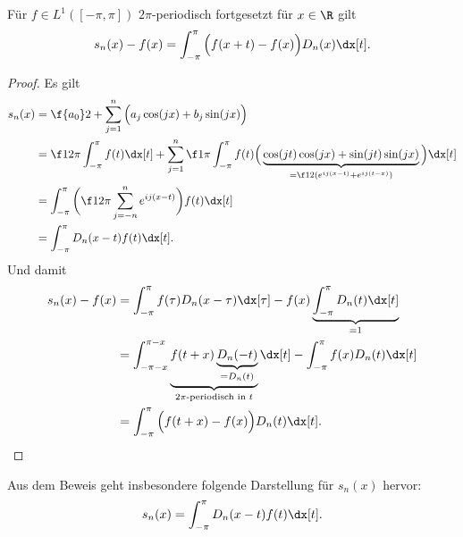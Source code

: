 \begin{lem} \label{3.26}
	Für $f \in L^1([-\pi, \pi])$ $2\pi$-periodisch fortgesetzt für $x\in \R$ gilt
	\begin{align*}
		s_n(x) - f(x) = \int_{-\pi}^{\pi} \Big(f(x+t) - f(x)\Big) D_n(x) \dx[t].
	\end{align*}
	\begin{proof}
		Es gilt
		\begin{align*}
			s_n(x) 
			&= \f {a_0}2 + \sum_{j=1}^n \Big( a_j \cos(jx) + b_j \sin(jx) \Big) \\
			&= \f 1{2 \pi} \int_{-\pi}^{\pi} f(t) \dx[t] + \sum_{j=1}^n \f 1{\pi} \int_{-\pi}^{\pi} f(t) \Big( \underbrace{\cos(jt) \cos(jx) + \sin(jt) \sin(jx)}_{= \f 12 ( e^{ij(x-t)} + e^{ij(t-x)})} \Big) \dx[t] \\
			&= \int_{-\pi}^{\pi} \bigg( \f 1{2\pi} \sum_{j=-n}^n e^{ij(x-t)} \bigg) f(t) \dx[t] \\
			&= \int_{-\pi}^{\pi} D_n(x-t) f(t) \dx[t].
		\end{align*}
		\fixme[überprüfen.] Und damit
		\begin{align*}
			s_n(x) - f(x) 
			&= \int_{-\pi}^{\pi} f(\tau) D_n(x-\tau) \dx[\tau] - f(x) \underbrace{\int_{-\pi}^{\pi} D_n(t) \dx[t]}_{=1} \\
			&= \int_{-\pi-x}^{\pi-x} \underbrace{f(t + x)\underbrace{D_n(-t)}_{=D_n(t)}}_{\text{$2\pi$-periodisch in $t$}} \dx[t] - \int_{-\pi}^\pi f(x) D_n(t) \dx[t] \\
			&= \int_{-\pi}^{\pi} \Big( f(t + x) - f(x) \Big) D_n(t) \dx[t].
		\end{align*}
	\end{proof}
	\begin{note}
		Aus dem Beweis geht insbesondere folgende Darstellung für $s_n(x)$ hervor:
		\begin{align*}
			s_n(x) = \int_{-\pi}^{\pi} D_n(x-t) f(t) \dx[t].
		\end{align*}
		\fixme[überprüfen.]
	\end{note}
\end{lem}

